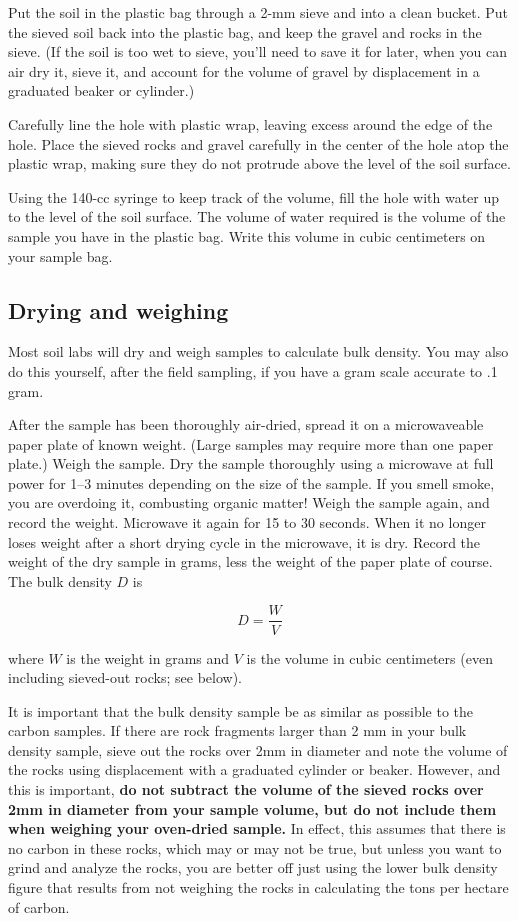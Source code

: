 \documentclass[11pt,letterpaper,oneside,onecolumn]{memoir}
\begin{document}
Put the soil in the plastic bag through a 2-mm sieve and into a clean bucket. Put the sieved soil back into the plastic bag, and keep the gravel and rocks in the sieve. (If the soil is too wet to sieve, you'll need to save it for later, when you can air dry it, sieve it, and account for the volume of gravel by displacement in a graduated beaker or cylinder.)

Carefully line the hole with plastic wrap, leaving excess around the edge of the hole. Place the sieved rocks and gravel carefully in the center of the hole atop the plastic wrap, making sure they do not protrude above the level of the soil surface.

Using the 140-cc syringe to keep track of the volume, fill the hole with water up to the level of the soil surface. The volume of water required is the volume of the sample you have in the plastic bag. Write this volume in cubic centimeters on your sample bag.

\subsection{Drying and weighing}

Most soil labs will dry and weigh samples to calculate bulk density. You may also do this yourself, after the field sampling, if you have a gram scale accurate to .1 gram.

After the sample has been thoroughly air-dried, spread it on a microwaveable paper plate of known weight. (Large samples may require more than one paper plate.) Weigh the sample. Dry the sample thoroughly using a microwave at full power for 1--3 minutes depending on the size of the sample. If you smell smoke, you are overdoing it, combusting organic matter! Weigh the sample again, and record the weight. Microwave it again for 15 to 30 seconds. When it no longer loses weight after a short drying cycle in the microwave, it is dry. Record the weight of the dry sample in grams, less the weight of the paper plate of course. The bulk density $D$ is

\begin{equation}D = \frac{W}{V}\end{equation}

\noindent where $W$ is the weight in grams and $V$ is the volume in cubic centimeters (even including sieved-out rocks; see below).

It is important that the bulk density sample be as similar as possible to the carbon samples. If there are rock fragments larger than 2 mm in your bulk density sample, sieve out the rocks over 2mm in diameter and note the volume of the rocks using displacement with a graduated cylinder or beaker. However, and this is important, \textbf{do not subtract the volume of the sieved rocks over 2mm in diameter from your sample volume, but do not include them when weighing your oven-dried sample.} In effect, this assumes that there is no carbon in these rocks, which may or may not be true, but unless you want to grind and analyze the rocks, you are better off just using the lower bulk density figure that results from not weighing the rocks in calculating the tons per hectare of carbon.
\end{document}

